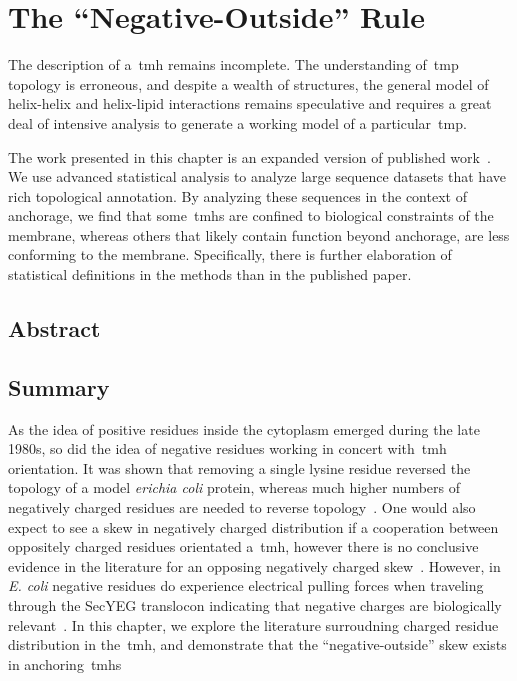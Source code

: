 
\chapter{The ``Negative-Outside'' Rule}
\sloppy
The description of a~\gls{tmh} remains incomplete.
The understanding of~\gls{tmp} topology is erroneous, and despite a wealth of structures, the general model of helix-helix and helix-lipid interactions remains speculative and requires a great deal of intensive analysis to generate a working model of a particular~\gls{tmp}.

The work presented in this chapter is an expanded version of published work~\cite{Baker2017}.
We use advanced statistical analysis to analyze large sequence datasets that have rich topological annotation.
By analyzing these sequences in the context of anchorage, we find that some~\gls{tmh}s are confined to biological constraints of the membrane, whereas others that likely contain function beyond anchorage, are less conforming to the membrane.
Specifically, there is further elaboration of statistical definitions in the methods than in the published paper.

\section{Abstract}

\section{Summary}
As the idea of positive residues inside the cytoplasm emerged during the late 1980s, so did the idea of negative residues working in concert with~\gls{tmh} orientation.
It was shown that removing a single lysine residue reversed the topology of a model \textit{erichia coli} protein, whereas much higher numbers of negatively charged residues are needed to reverse topology~\cite{Nilsson1990}.
One would also expect to see a skew in negatively charged distribution if a cooperation between oppositely charged residues orientated a~\gls{tmh}, however there is no conclusive evidence in the literature for an opposing negatively charged skew~\cite{Granseth2005, Nilsson2005a, Sharpe2010, Baeza-Delgado2013, Pogozheva2013}.
However, in \textit{E.
coli} negative residues do experience electrical pulling forces when traveling through the SecYEG translocon indicating that negative charges are biologically relevant~\cite{Ismail2015}.
In this chapter, we explore the literature surroudning charged residue distribution in the~\gls{tmh}, and demonstrate that the ``negative-outside'' skew exists in anchoring~\gls{tmh}s


